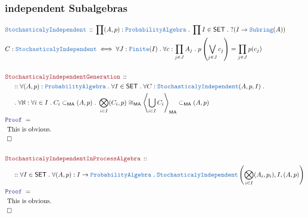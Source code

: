 \documentclass[12pt]{scrartcl}
\newcommand{\TYPE}[1]{\textcolor{NavyBlue}{\mathtt{#1}}}
\newcommand{\LOGIC}[1]{\textcolor{Blue}{\mathtt{#1}}}
\newcommand{\THM}[1]{\textcolor{Maroon}{\mathtt{#1}}}
\renewcommand{\.}{\; . \;}
\newcommand{\Theorem}[2]{& \THM{#1} \, :: \, #2 \\ & \Proof = \\ }
\newcommand{\DeclareType}[2]{& \TYPE{#1} \, :: \, #2 \\}
\newcommand{\DefineType}[3]{& #1 : \TYPE{#2} \iff #3 \\}
\newcommand{\NewLine}{\\ & \kern 1pc}
\newcommand{\Page}[1]{ \begin{align*} #1 \end{align*}   }
\newcommand{\QED}{\; \square}
\newcommand{\EndProof}{& \QED \\}
\newcommand{\Proof}{\LOGIC{Proof} \; }
\newcommand{\Explain}[1]{& \text{#1.} \\}
\newcommand{\SET}{\mathsf{SET}}
\newcommand{\SInd}{\TYPE{StochasticalyIndependent}}
\newcommand{\ma}{\mathsf{MA}}
\begin{document}
\subsubsection{independent Subalgebras}
\Page{
	\DeclareType{StochasticalyIndependent}
	{
		\prod (A,p) :  \TYPE{ProbabilityAlgebra} \.
		\prod I \in \SET \.
		?(I \to \TYPE{Subring}(A))
	}
	\DefineType{C}{StochasticalyIndependent}
	{
		\forall J : \TYPE{Finite}(I) \. 
		\forall c : \prod_{j \in J} A_j \.
		p\left( \bigvee_{j \in J} c_j \right) = \prod_{j \in J} p(c_j)
	}
	\\
	\Theorem{StochasticalyIndependentGeneration}
	{
		\NewLine ::		
		\forall (A,p) : \TYPE{ProbabilityAlgebra} \.
		\forall I \in \SET \.
		\forall C : \SInd(A,p,I) \. \NewLine \.
		\forall \aleph : \forall i \in I \. C_i \subset_\ma (A,p) \.
		\bigotimes_{i \in I} (C_i, p) \cong_\ma \left\langle \bigcup_{i \in I} C_i \right\rangle_\ma 
		\subset_\ma (A,p)
	}
	\Explain{ This is obvious}
	\EndProof
	\\
	\Theorem{StochasticalyIndependentInProcessAlgebra}
	{
		\NewLine ::		
		\forall I \in \SET \.
		\forall (A,p) : I \to \TYPE{ProbabilityAlgebra} \.
		 \SInd\left(\bigotimes_{i \in I} (A_i,p_i),I, (A,p)\right) }
	\Explain{ This is obvious}
	\EndProof
}
\newpage
\end{document}
